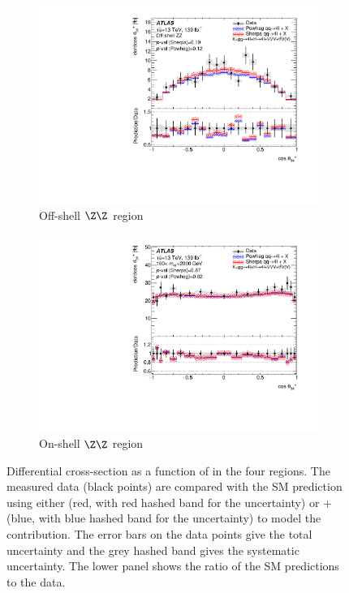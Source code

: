 \begin{figure}[H]
\begin{subfigure}{.49\textwidth}
      \includegraphics[width=.95\linewidth]{Figures/m4l/UnfoldedResults/linY_Unfolded_Data_cosThetaStar3_m4loffshell.pdf}  \caption{Off-shell $\Z\Z$ region}\label{fig:sub-third}
    \end{subfigure}
    \begin{subfigure}{.49\textwidth}\centering
      \includegraphics[width=.95\linewidth]{Figures/m4l/UnfoldedResults/linY_Unfolded_Data_cosThetaStar3_m4l180-2000.pdf}  \caption{On-shell $\Z\Z$ region}\label{fig:sub-fourth}
    \end{subfigure}
    \caption{Differential cross-section as a function of \CTSThreeFour{} in the four
        \mFourL{} regions. The measured data (black points) are  compared with the SM prediction using either \SHERPA{} (red, with red hashed band for the uncertainty) or \POWHEG{} + \pythia{} (blue, with blue hashed band for the uncertainty) to model the \qqFourL{} contribution. The error bars on the data points give the total uncertainty and the grey hashed band gives the systematic uncertainty. \Pvalue{} The  lower panel shows the ratio of the SM predictions to the data.}
    \label{fig:cts34_m4l}
\end{figure}

